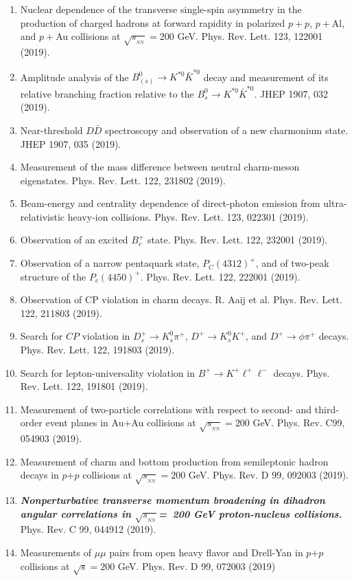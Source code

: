 \documentclass[11pt]{article}
\begin{document}
\begin{flushleft}
\begin{center}
\begin{enumerate}
		\item Nuclear dependence of the transverse single-spin asymmetry in the production of charged hadrons at forward rapidity in polarized $p+p$, $p+$Al, and $p+$Au collisions at $\sqrt{s_{_{NN}}}= 200$ GeV. Phys. Rev. Lett. 123, 122001 (2019).
		\item Amplitude analysis of the $B_{(s)}^0\rightarrow K^{*0}\bar{K}^{*0}$ decay and measurement of its relative branching fraction relative to the $B_s^0\rightarrow K^{*0}\bar{K}^{*0}$. JHEP 1907, 032 (2019).
		\item Near-threshold $D\bar{D}$ spectroscopy and observation of a new charmonium state. JHEP 1907, 035 (2019).
		\item Measurement of the mass difference between neutral charm-meson eigenstates. Phys. Rev. Lett. 122, 231802 (2019).
		\item Beam-energy and centrality dependence of direct-photon emission from ultra-relativistic heavy-ion collisions. Phys. Rev. Lett. 123, 022301 (2019).
		\item Observation of an excited $B_c^+$ state. Phys. Rev. Lett. 122, 232001 (2019). 
		\item Observation of a narrow pentaquark state, $P_C(4312)^+$, and of two-peak structure of the $P_c(4450)^+$. Phys. Rev. Lett. 122, 222001 (2019).
		\item Observation of CP violation in charm decays. R. Aaij et al. Phys. Rev. Lett. 122, 211803 (2019).
		\item Search for $CP$ violation in $D_s^+\rightarrow K_s^0\pi^+$, $D^+\rightarrow K_s^0K^+$, and $D^+\rightarrow\phi\pi^+$ decays. Phys. Rev. Lett. 122, 191803 (2019).
		\item Search for lepton-universality violation in $B^+\rightarrow K^+\ell^+\ell^-$ decays. Phys. Rev. Lett. 122, 191801 (2019).
		\item Measurement of two-particle correlations with respect to second- and third-order event planes in Au+Au collisions at $\sqrt{s_{_{NN}}}=200$ GeV. Phys. Rev. C99, 054903 (2019).	
		\item Measurement of charm and bottom production from semileptonic hadron decays in $p$$+$$p$ collisions at $\sqrt{s_{_{NN}}}=200$ GeV. Phys. Rev. D 99, 092003 (2019).
		\item  \textbf{\textit{Nonperturbative transverse momentum broadening in dihadron angular correlations in $\sqrt{s_{_{NN}}}$=~200 GeV proton-nucleus collisions.}} Phys. Rev. C 99, 044912 (2019).
		\item Measurements of $\mu\mu$ pairs from open heavy flavor and Drell-Yan in $p$$+$$p$ collisions at $\sqrt{s}=200$ GeV. Phys. Rev. D 99, 072003 (2019)

\end{enumerate}
\end{center}
\end{flushleft}
\end{document}
